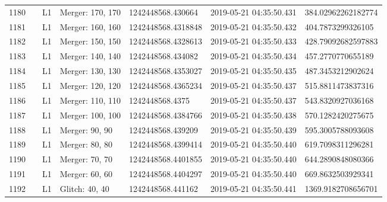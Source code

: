 \begin{longtable}{lllllll}
1180 &                                                    &       L1 &  Merger: 170, 170 &   1242448568.430664 &  2019-05-21 04:35:50.431 &  384.02962262182774 \\
1181 &                                                    &       L1 &  Merger: 160, 160 &  1242448568.4318848 &  2019-05-21 04:35:50.432 &   404.7873299326105 \\
1182 &                                                    &       L1 &  Merger: 150, 150 &  1242448568.4328613 &  2019-05-21 04:35:50.433 &  428.79092682597883 \\
1183 &                                                    &       L1 &  Merger: 140, 140 &   1242448568.434082 &  2019-05-21 04:35:50.434 &   457.2770770655189 \\
1184 &                                                    &       L1 &  Merger: 130, 130 &  1242448568.4353027 &  2019-05-21 04:35:50.435 &   487.3453212902624 \\
1185 &                                                    &       L1 &  Merger: 120, 120 &  1242448568.4365234 &  2019-05-21 04:35:50.437 &   515.8811473837316 \\
1186 &                                                    &       L1 &  Merger: 110, 110 &     1242448568.4375 &  2019-05-21 04:35:50.437 &   543.8320927036168 \\
1187 &                                                    &       L1 &  Merger: 100, 100 &  1242448568.4384766 &  2019-05-21 04:35:50.438 &   570.1282420275675 \\
1188 &                                                    &       L1 &    Merger: 90, 90 &   1242448568.439209 &  2019-05-21 04:35:50.439 &   595.3005788093608 \\
1189 &                                                    &       L1 &    Merger: 80, 80 &  1242448568.4399414 &  2019-05-21 04:35:50.440 &   619.7098311296281 \\
1190 &                                                    &       L1 &    Merger: 70, 70 &  1242448568.4401855 &  2019-05-21 04:35:50.440 &   644.2890848080366 \\
1191 &                                                    &       L1 &    Merger: 60, 60 &  1242448568.4404297 &  2019-05-21 04:35:50.440 &   669.8632503929341 \\
1192 &                                                    &       L1 &    Glitch: 40, 40 &   1242448568.441162 &  2019-05-21 04:35:50.441 &  1369.9182708656701 \\

\end{longtable}
